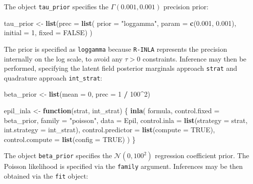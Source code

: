\documentclass[a4paper, nobind]{templates/ociamthesis}
\newenvironment{Shaded}{\begin{snugshade}}{\end{snugshade}}
\newcommand{\AttributeTok}[1]{\textcolor[rgb]{0.13,0.29,0.53}{#1}}
\newcommand{\ConstantTok}[1]{\textcolor[rgb]{0.56,0.35,0.01}{#1}}
\newcommand{\ControlFlowTok}[1]{\textcolor[rgb]{0.13,0.29,0.53}{\textbf{#1}}}
\newcommand{\DecValTok}[1]{\textcolor[rgb]{0.00,0.00,0.81}{#1}}
\newcommand{\FloatTok}[1]{\textcolor[rgb]{0.00,0.00,0.81}{#1}}
\newcommand{\FunctionTok}[1]{\textcolor[rgb]{0.13,0.29,0.53}{\textbf{#1}}}
\newcommand{\NormalTok}[1]{#1}
\newcommand{\OtherTok}[1]{\textcolor[rgb]{0.56,0.35,0.01}{#1}}
\newcommand{\SpecialCharTok}[1]{\textcolor[rgb]{0.81,0.36,0.00}{\textbf{#1}}}
\newcommand{\StringTok}[1]{\textcolor[rgb]{0.31,0.60,0.02}{#1}}
\renewenvironment{Shaded}
{
  \vspace{10pt}%
  \begin{snugshade}%
}{%
  \end{snugshade}%
  \vspace{8pt}%
}
\begin{document}
The object \texttt{tau\_prior} specifies the \(\Gamma(0.001, 0.001)\) precision prior:

\begin{Shaded}
\begin{Highlighting}[]
\NormalTok{tau\_prior }\OtherTok{\textless{}{-}} \FunctionTok{list}\NormalTok{(}\AttributeTok{prec =} \FunctionTok{list}\NormalTok{(}
  \AttributeTok{prior =} \StringTok{"loggamma"}\NormalTok{,}
  \AttributeTok{param =} \FunctionTok{c}\NormalTok{(}\FloatTok{0.001}\NormalTok{, }\FloatTok{0.001}\NormalTok{),}
  \AttributeTok{initial =} \DecValTok{1}\NormalTok{,}
  \AttributeTok{fixed =} \ConstantTok{FALSE}\NormalTok{)}
\NormalTok{)}
\end{Highlighting}
\end{Shaded}

The prior is specified as \texttt{loggamma} because \texttt{R-INLA} represents the precision internally on the log scale, to avoid any \(\tau > 0\) constraints.
Inference may then be performed, specifying the latent field posterior marginals approach \texttt{strat} and quadrature approach \texttt{int\_strat}:

\begin{Shaded}
\begin{Highlighting}[]
\NormalTok{beta\_prior }\OtherTok{\textless{}{-}} \FunctionTok{list}\NormalTok{(}\AttributeTok{mean =} \DecValTok{0}\NormalTok{, }\AttributeTok{prec =} \DecValTok{1} \SpecialCharTok{/} \DecValTok{100}\SpecialCharTok{\^{}}\DecValTok{2}\NormalTok{)}

\NormalTok{epil\_inla }\OtherTok{\textless{}{-}} \ControlFlowTok{function}\NormalTok{(strat, int\_strat) \{}
  \FunctionTok{inla}\NormalTok{(}
\NormalTok{    formula,}
    \AttributeTok{control.fixed =}\NormalTok{ beta\_prior,}
    \AttributeTok{family =} \StringTok{"poisson"}\NormalTok{,}
    \AttributeTok{data =}\NormalTok{ Epil,}
    \AttributeTok{control.inla =} \FunctionTok{list}\NormalTok{(}\AttributeTok{strategy =}\NormalTok{ strat, }\AttributeTok{int.strategy =}\NormalTok{ int\_strat),}
    \AttributeTok{control.predictor =} \FunctionTok{list}\NormalTok{(}\AttributeTok{compute =} \ConstantTok{TRUE}\NormalTok{),}
    \AttributeTok{control.compute =} \FunctionTok{list}\NormalTok{(}\AttributeTok{config =} \ConstantTok{TRUE}\NormalTok{)}
\NormalTok{  )}
\NormalTok{\}}
\end{Highlighting}
\end{Shaded}

The object \texttt{beta\_prior} specifies the \(\mathcal{N}(0, 100^2)\) regression coefficient prior.
The Poisson likelihood is specified via the \texttt{family} argument.
Inferences may be then obtained via the \texttt{fit} object:
\end{document}

